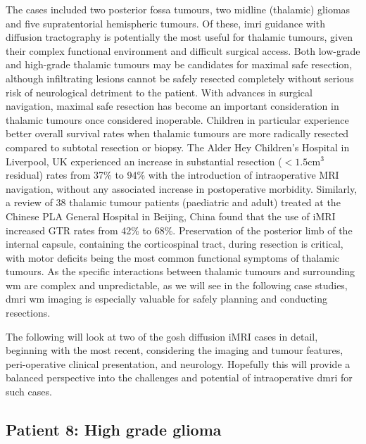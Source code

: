 The cases included two posterior fossa tumours, two midline (thalamic) gliomas and five supratentorial hemispheric tumours.
Of these, \gls{imri} guidance with diffusion tractography is potentially the most useful for thalamic tumours, given their complex functional environment and difficult surgical access.
Both low-grade \autocite{Wong2016} and high-grade\autocite{Dorfer2021} thalamic tumours may be candidates for maximal safe resection, although infiltrating lesions cannot be safely resected completely without serious risk of neurological detriment to the patient.
With advances in surgical navigation, maximal safe resection has become an important consideration in thalamic tumours once considered inoperable\autocite{Souweidane1996,Puget2007,Steinbok2016,Grewal2019,Sunderland2021}.
Children in particular\autocite{Ferroli2023} experience better overall survival rates when thalamic tumours are more radically resected compared to subtotal resection or biopsy\autocite{Cinalli2018}.
The Alder Hey Children's Hospital in Liverpool, UK experienced an increase in substantial resection ($<1.5$cm$^3$ residual) rates from 37\% to 94\% with the introduction of intraoperative MRI navigation, without any associated increase in postoperative morbidity\autocite{Sunderland2021}.
Similarly, a review of 38 thalamic tumour patients (paediatric and adult) treated at the Chinese PLA General Hospital in Beijing, China found that the use of iMRI increased GTR rates from 42\% to 68\%\autocite{Zheng2016}.
Preservation of the posterior limb of the internal capsule, containing the corticospinal tract, during resection is critical, with motor deficits being the most common functional symptoms of thalamic tumours\autocite{Puget2007, Zheng2016, Palmisciano2021}.
As the specific interactions between thalamic tumours and surrounding \gls{wm} are complex and unpredictable, as we will see in the following case studies, \gls{dmri} \gls{wm} imaging is especially valuable for safely planning and conducting resections\autocite{Celtikci2017}.

The following will look at two of the \gls{gosh} diffusion iMRI cases in detail, beginning with the most recent, considering the imaging and tumour features, peri-operative clinical presentation, and neurology.
Hopefully this will provide a balanced perspective into the challenges and potential of intraoperative \gls{dmri} for such cases.

\subsection{Patient 8: High grade glioma}

